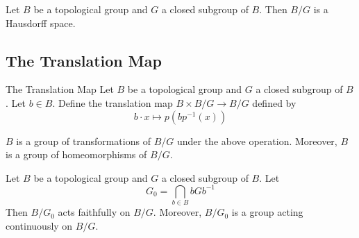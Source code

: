 \documentclass[a4paper]{article}
\begin{document}
\begin{prp}{}{} Let $B$ be a topological group and $G$ a closed subgroup of $B$. Then $B/G$ is a Hausdorff space. 
\end{prp}

\subsection{The Translation Map}
\begin{defn}{The Translation Map}{} Let $B$ be a topological group and $G$ a closed subgroup of $B$. Let $b\in B$. Define the translation map $B\times B/G\to B/G$ defined by $$b\cdot x\mapsto p(bp^{-1}(x))$$
\end{defn}

\begin{prp}{}{} $B$ is a group of transformations of $B/G$ under the above operation. Moreover, $B$ is a group of homeomorphisms of $B/G$. 
\end{prp}

\begin{prp}{}{} Let $B$ be a topological group and $G$ a closed subgroup of $B$. Let $$G_0=\bigcap_{b\in B}bGb^{-1}$$ Then $B/G_0$ acts faithfully on $B/G$. Moreover, $B/G_0$ is a group acting continuously on $B/G$. 
\end{prp}
\end{document}

